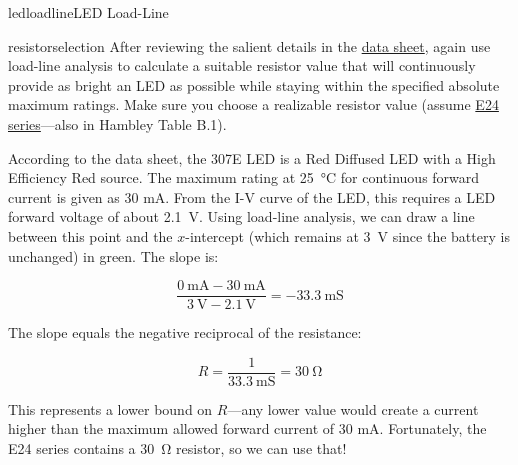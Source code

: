 \begin{mainquestion}{ledloadline}{LED Load-Line}
\begin{partquestion}{resistorselection}
{After reviewing the salient details in the \href{https://www.jameco.com/Jameco/Products/ProdDS/697522.pdf}{data sheet}, again use load-line analysis to calculate a suitable resistor value that will continuously provide as bright an LED as possible while staying within the specified absolute maximum ratings. Make sure you choose a realizable resistor value (assume \href{https://asenergi.com/pdf/resistors/standard-resistor-values-e24.pdf}{E24 series}---also in Hambley Table B.1).}

\begin{answer}
According to the data sheet, the 307E LED is a Red Diffused LED with a High Efficiency Red source. The maximum rating at 25~°C for continuous forward current is given as 30 mA. From the I-V curve of the LED, this requires a LED forward voltage of about \qty{2.1}{\volt}. Using load-line analysis, we can draw a line between this point and the $x$-intercept (which remains at \qty{3}{\volt} since the battery is unchanged) in green. The slope is:

\[
\frac{\qty{0}{\milli\ampere} - \qty{30}{\milli\ampere}}{\qty{3}{\volt} - \qty{2.1}{\volt}} = -\qty{33.3}{\milli\siemens}
\]

The slope equals the negative reciprocal of the resistance:

\[
R = \frac{1}{\qty{33.3}{\milli\siemens}} = \qty{30}{\ohm}
\]

This represents a lower bound on $R$---any lower value would create a current higher than the maximum allowed forward current of 30 mA. Fortunately, the E24 series contains a \qty{30}{\ohm} resistor, so we can use that!
\end{answer}
\end{partquestion}

\end{mainquestion}
